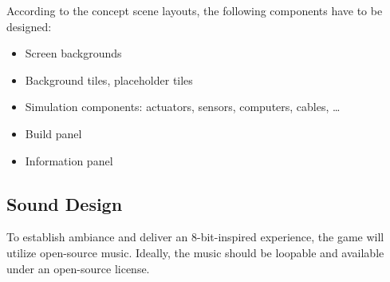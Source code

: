According to the concept scene layouts, the following components have to be designed:
\begin{itemize}
    \item Screen backgrounds
    \item Background tiles, placeholder tiles
    \item Simulation components: actuators, sensors, computers, cables, \ldots
    \item Build panel
    \item Information panel
\end{itemize}

\subsection{Sound Design}\label{subsec:sound-design}
To establish ambiance and deliver an 8-bit-inspired experience, the game will utilize open-source music.
Ideally, the music should be loopable and available under an open-source license.

